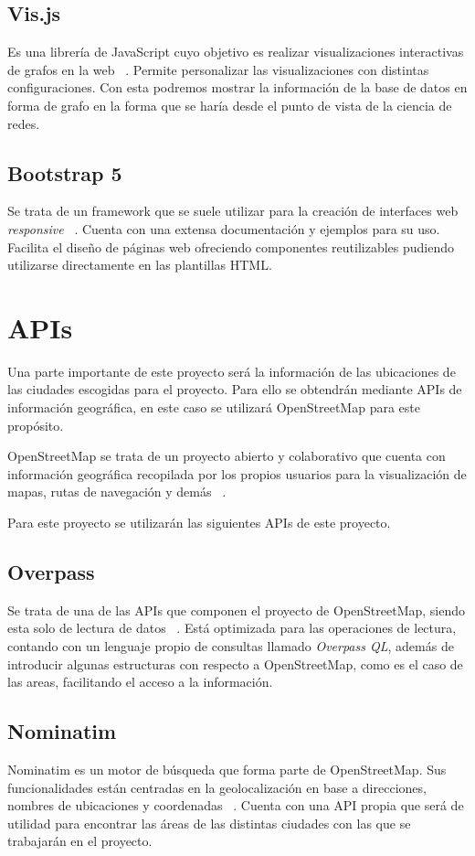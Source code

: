 \subsection{Vis.js}
Es una librería de JavaScript cuyo objetivo es realizar visualizaciones interactivas de grafos en la web ~\cite{visjsVisjs}.
Permite personalizar las visualizaciones con distintas configuraciones. Con esta podremos mostrar
la información de la base de datos en forma de grafo en la forma que se haría desde el punto de vista de la ciencia
de redes.

\subsection{Bootstrap 5}
Se trata de un framework que se suele utilizar para la creación de interfaces web \textit{responsive} ~\cite{Bootstrap}.
Cuenta con una extensa documentación y ejemplos para su uso. Facilita el diseño de páginas web ofreciendo
componentes reutilizables pudiendo utilizarse directamente en las plantillas HTML.


\section{APIs}
Una parte importante de este proyecto será la información de las ubicaciones de las ciudades escogidas
para el proyecto. Para ello se obtendrán mediante APIs de información geográfica, en este caso se utilizará
OpenStreetMap para este propósito. 

OpenStreetMap se trata de un proyecto abierto y colaborativo que cuenta con información geográfica
recopilada por los propios usuarios para la visualización de mapas, rutas de navegación y demás ~\cite{OSM}.

Para este proyecto se utilizarán las siguientes APIs de este proyecto. 

\subsection{Overpass}
Se trata de una de las APIs que componen el proyecto de OpenStreetMap, siendo esta solo de lectura de datos ~\cite{Overpass, openstreetmapOverpassOpenStreetMap}.
Está optimizada para las operaciones de lectura, contando con un lenguaje propio de consultas llamado \textit{Overpass QL},
además de introducir algunas estructuras con respecto a OpenStreetMap, como es el caso de las areas, facilitando el acceso a la información.

\subsection{Nominatim}
Nominatim es un motor de búsqueda que forma parte de OpenStreetMap. Sus funcionalidades están centradas en la 
geolocalización en base a direcciones, nombres de ubicaciones y coordenadas ~\cite{nominatimNominatim}. Cuenta con una API propia
que será de utilidad para encontrar las áreas de las distintas ciudades con las que se trabajarán en el proyecto.

